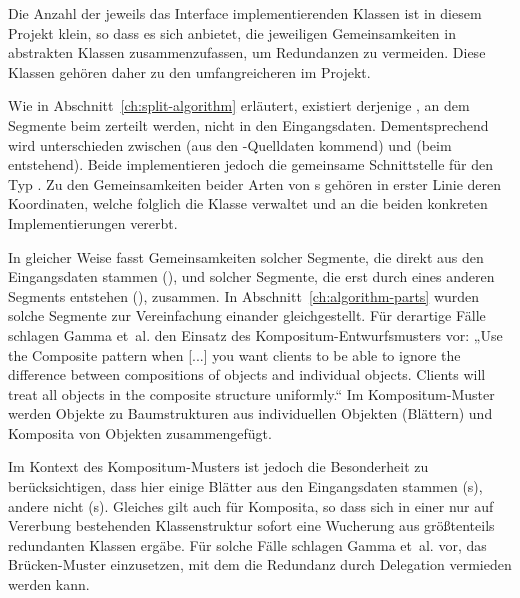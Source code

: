 \documentclass[../main/thesis.tex]{subfiles}
\begin{document}
Die Anzahl der jeweils das Interface implementierenden Klassen ist in diesem Projekt klein, so dass es sich anbietet, die jeweiligen Gemeinsamkeiten in abstrakten Klassen
zusammenzufassen, um Redundanzen zu vermeiden.
Diese Klassen gehören daher zu den umfangreicheren im Projekt.

Wie in Abschnitt~\ref{ch:split-algorithm} erläutert, existiert derjenige , an dem Segmente beim  zerteilt werden, nicht in den Eingangsdaten.
Dementsprechend wird unterschieden zwischen  (aus den \osm-Quelldaten kommend) und  (beim  entstehend).
Beide implementieren jedoch die gemeinsame Schnittstelle für den Typ .
Zu den Gemeinsamkeiten beider Arten von s gehören in erster Linie deren Koordinaten, welche folglich die Klasse  verwaltet und an die beiden konkreten Implementierungen vererbt.

In gleicher Weise fasst  Gemeinsamkeiten solcher Segmente, die direkt aus den Eingangsdaten stammen (), und solcher Segmente, die erst durch  eines anderen Segments entstehen (), zusammen.
In Abschnitt~\ref{ch:algorithm-parts} wurden solche Segmente zur Vereinfachung einander gleichgestellt.
Für derartige Fälle schlagen Gamma et~al. den Einsatz des Kompositum-Entwurfsmusters vor:
„Use the Composite pattern when [...] you want clients to be able to ignore the difference between compositions of objects and individual objects. Clients will treat all objects in the composite structure uniformly.“ 
Im Kompositum-Muster werden Objekte zu Baumstrukturen aus individuellen Objekten (Blättern) und Komposita von Objekten zusammengefügt.

Im Kontext des Kompositum-Musters ist jedoch die Besonderheit zu berücksichtigen, dass hier einige Blätter aus den Eingangsdaten stammen (s), andere nicht (s).
Gleiches gilt auch für Komposita, so dass sich in einer nur auf Vererbung bestehenden Klassenstruktur sofort eine Wucherung aus größtenteils redundanten Klassen ergäbe.
Für solche Fälle schlagen Gamma et~al. vor, das Brücken-Muster  einzusetzen, mit dem die Redundanz durch Delegation vermieden werden kann. 
\end{document}
